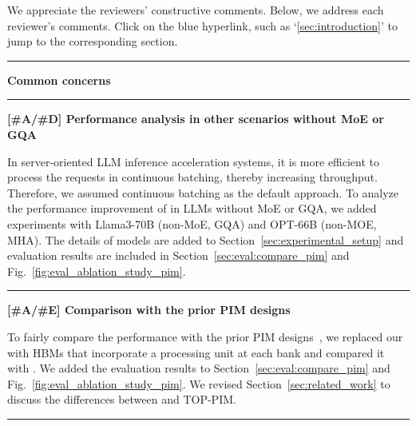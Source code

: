 \label{sec:0_cover_page}

We appreciate the reviewers' constructive comments. 
%
Below, we address each reviewer's comments. 
%
Click on the blue hyperlink, such as `\ref{sec:introduction}' to jump to the corresponding section.
%
%
\rule[0.5ex]{8.8cm}{2pt}

\begin{center}
    \large \textbf{Common concerns}
\end{center}

\noindent
\rule[0.5ex]{8.8cm}{2pt}

\noindent
\textbf{[\#A/\#D] Performance analysis in other scenarios without MoE or GQA}
%

In server-oriented LLM inference acceleration systems, it is more efficient to process the requests in continuous batching, thereby increasing throughput. 
Therefore, we assumed continuous batching as the default approach.
To analyze the performance improvement of \duplex in LLMs without MoE or GQA, we added experiments with Llama3-70B (non-MoE, GQA) and OPT-66B (non-MOE, MHA).
The details of models are added to Section~\ref{sec:experimental_setup} and evaluation results are included in Section~\ref{sec:eval:compare_pim} and Fig.~\ref{fig:eval_ablation_study_pim}.


\noindent
\rule[0.5ex]{8.8cm}{0.5pt}

\noindent
\textbf{[\#A/\#E] Comparison with the prior PIM designs}
%

To fairly compare the performance with the prior PIM designs~\cite{isca-2021-hbm-pim, isscc-2022-aim, asplos-2024-attacc, asplos-2024-neupim}, we replaced our \lowp with HBMs that incorporate a processing unit at each bank and compared it with \duplex.
We added the evaluation results to Section~\ref{sec:eval:compare_pim} and Fig.~\ref{fig:eval_ablation_study_pim}.
We revised Section~\ref{sec:related_work} to discuss the differences between \duplex and TOP-PIM.


\noindent
\rule[0.5ex]{8.8cm}{0.5pt}



